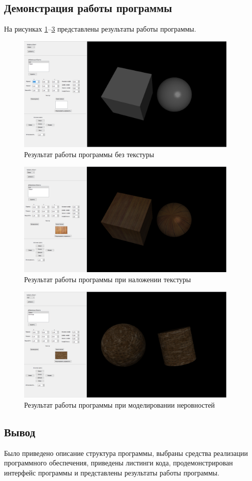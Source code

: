 \subsection{Демонстрация работы программы}
На рисунках \ref{fig:demon1}--\ref{fig:demon3} представлены результаты работы программы.
\clearpage
\begin{figure}[h]
	\centering
	\includegraphics[width=0.95\textwidth]{img/examples/demon1.png}
	\caption{Результат работы программы без текстуры}
	\label{fig:demon1}
\end{figure}

\begin{figure}[h]
	\centering
	\includegraphics[width=0.95\textwidth]{img/examples/demon2.png}
	\caption{Результат работы программы при наложении текстуры}
	\label{fig:demon2}
\end{figure}

\begin{figure}[h]
	\centering
	\includegraphics[width=0.95\textwidth]{img/examples/demon3.png}
	\caption{Результат работы программы при моделировании неровностей}
	\label{fig:demon3}
\end{figure}
\clearpage
\subsection*{Вывод}
Было приведено описание структура программы, выбраны средства реализации программного обеспечения, приведены листинги кода, продемонстрирован интерфейс программы и представлены результаты работы программы. 

